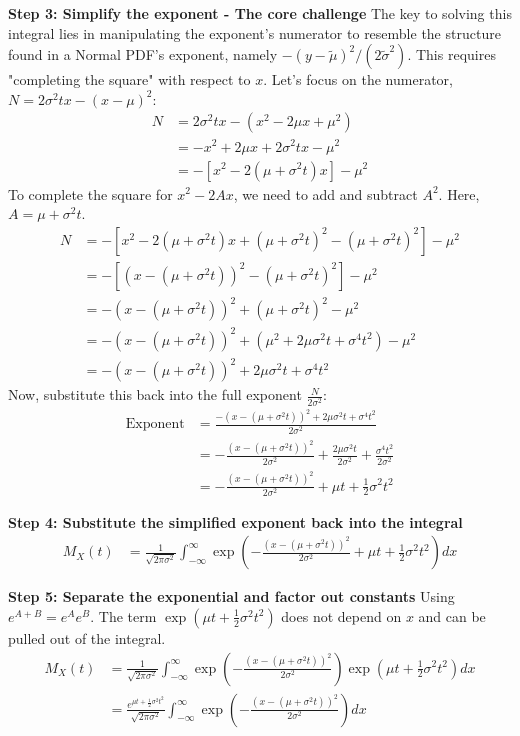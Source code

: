 \documentclass[11pt, letterpaper]{article}
\theoremstyle{definition}
\theoremstyle{remark}
\begin{document}
\textbf{Step 3: Simplify the exponent - The core challenge}
The key to solving this integral lies in manipulating the exponent's numerator to resemble the structure found in a Normal PDF's exponent, namely $-(y - \tilde{\mu})^2 / (2\tilde{\sigma}^2)$. This requires "completing the square" with respect to $x$. Let's focus on the numerator, $N = 2\sigma^2 tx - (x-\mu)^2$:
\begin{align*}
    N &= 2\sigma^2 tx - (x^2 - 2\mu x + \mu^2) \\
      &= -x^2 + 2\mu x + 2\sigma^2 tx - \mu^2 \\
      &= -[x^2 - 2(\mu + \sigma^2 t)x] - \mu^2 
\end{align*}
To complete the square for $x^2 - 2Ax$, we need to add and subtract $A^2$. Here, $A = \mu + \sigma^2 t$.
\begin{align*}
    N &= -[x^2 - 2(\mu + \sigma^2 t)x + (\mu + \sigma^2 t)^2 - (\mu + \sigma^2 t)^2] - \mu^2 \\
      &= -[(x - (\mu + \sigma^2 t))^2 - (\mu + \sigma^2 t)^2] - \mu^2 \\
      &= -(x - (\mu + \sigma^2 t))^2 + (\mu + \sigma^2 t)^2 - \mu^2 \\
      &= -(x - (\mu + \sigma^2 t))^2 + (\mu^2 + 2\mu\sigma^2 t + \sigma^4 t^2) - \mu^2 \\
      &= -(x - (\mu + \sigma^2 t))^2 + 2\mu\sigma^2 t + \sigma^4 t^2 
\end{align*}
Now, substitute this back into the full exponent $\frac{N}{2\sigma^2}$:
\begin{align*}
    \text{Exponent} &= \frac{-(x - (\mu + \sigma^2 t))^2 + 2\mu\sigma^2 t + \sigma^4 t^2}{2\sigma^2} \\
                   &= -\frac{(x - (\mu + \sigma^2 t))^2}{2\sigma^2} + \frac{2\mu\sigma^2 t}{2\sigma^2} + \frac{\sigma^4 t^2}{2\sigma^2} \\
                   &= -\frac{(x - (\mu + \sigma^2 t))^2}{2\sigma^2} + \mu t + \frac{1}{2}\sigma^2 t^2
\end{align*}

\textbf{Step 4: Substitute the simplified exponent back into the integral}
\begin{align*}
    M_X(t) &= \frac{1}{\sqrt{2 \pi \sigma^2}} \int_{-\infty}^{\infty} \exp\left( -\frac{(x - (\mu + \sigma^2 t))^2}{2\sigma^2} + \mu t + \frac{1}{2}\sigma^2 t^2 \right) dx 
\end{align*}

\textbf{Step 5: Separate the exponential and factor out constants}
Using $e^{A+B} = e^A e^B$. The term $\exp(\mu t + \frac{1}{2}\sigma^2 t^2)$ does not depend on $x$ and can be pulled out of the integral.
\begin{align*}
    M_X(t) &= \frac{1}{\sqrt{2 \pi \sigma^2}} \int_{-\infty}^{\infty} \exp\left( -\frac{(x - (\mu + \sigma^2 t))^2}{2\sigma^2} \right) \exp\left( \mu t + \frac{1}{2}\sigma^2 t^2 \right) dx \\
           &= \frac{e^{\mu t + \frac{1}{2}\sigma^2 t^2}}{\sqrt{2 \pi \sigma^2}} \int_{-\infty}^{\infty} \exp\left( -\frac{(x - (\mu + \sigma^2 t))^2}{2\sigma^2} \right) dx 
\end{align*}
\end{document}
